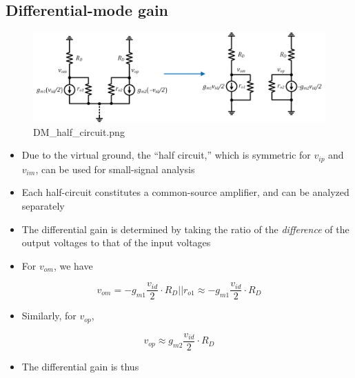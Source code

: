 \documentclass[11pt]{article}
\providecommand{\tightlist}{%
      \setlength{\itemsep}{0pt}\setlength{\parskip}{0pt}}
\begin{document}
    \hypertarget{differential-mode-gain}{%
\subsection{Differential-mode gain}\label{differential-mode-gain}}

    \begin{figure}
\centering
\includegraphics{DM_half_circuit.png}
\caption{DM\_half\_circuit.png}
\end{figure}

    \begin{itemize}
\tightlist
\item
  Due to the virtual ground, the ``half circuit,'' which is symmetric
  for \(v_{ip}\) and \(v_{im}\), can be used for small-signal analysis
\item
  Each half-circuit constitutes a common-source amplifier, and can be
  analyzed separately
\item
  The differential gain is determined by taking the ratio of the
  \emph{difference} of the output voltages to that of the input voltages
\end{itemize}

    \begin{itemize}
\tightlist
\item
  For \(v_{om}\), we have
\end{itemize}

\begin{equation}
v_{om} = -g_{m1}\dfrac{v_{id}}{2}\cdot R_D||r_{o1} \approx -g_{m1}\dfrac{v_{id}}{2}\cdot R_D
\end{equation}

\begin{itemize}
\tightlist
\item
  Similarly, for \(v_{op}\),
\end{itemize}

\begin{equation}
v_{op} \approx g_{m2}\dfrac{v_{id}}{2}\cdot R_D
\end{equation}

\begin{itemize}
\tightlist
\item
  The differential gain is thus
\end{itemize}
\end{document}

